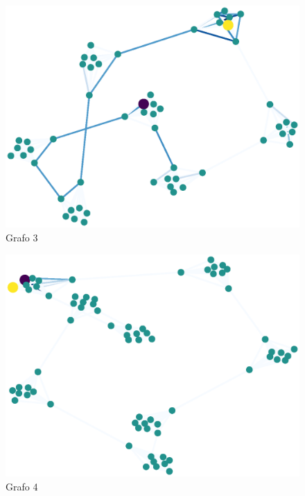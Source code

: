 \documentclass{article}
\begin{document}
\begin{figure}[H]
    \includegraphics[width=\textwidth]{res-3}
    \caption{Grafo 3}
    \label{fig:matriz}
\end{figure}
\begin{figure}[H]
    \includegraphics[width=\textwidth]{res-4}
    \caption{Grafo 4}
    \label{fig:matriz}
\end{figure}
\end{document}
